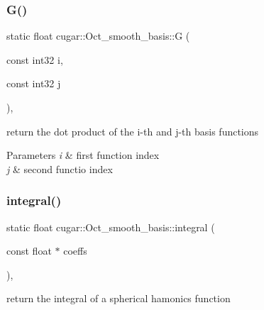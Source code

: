 \subsubsection{\texorpdfstring{G()}{G()}}
{\footnotesize\ttfamily static float cugar\+::\+Oct\+\_\+smooth\+\_\+basis\+::G (\begin{DoxyParamCaption}\item[{const int32}]{i,  }\item[{const int32}]{j }\end{DoxyParamCaption})\hspace{0.3cm}{\ttfamily [inline]}, {\ttfamily [static]}}

return the dot product of the i-\/th and j-\/th basis functions


\begin{DoxyParams}{Parameters}
{\em i} & first function index \\
\hline
{\em j} & second functio index \\
\hline
\end{DoxyParams}
\mbox{\label{structcugar_1_1_oct__smooth__basis_afdbf96838ebf4a79dfbbde82566ef711}} 
\subsubsection{\texorpdfstring{integral()}{integral()}\hspace{0.1cm}{\footnotesize\ttfamily [1/2]}}
{\footnotesize\ttfamily static float cugar\+::\+Oct\+\_\+smooth\+\_\+basis\+::integral (\begin{DoxyParamCaption}\item[{const float $\ast$}]{coeffs }\end{DoxyParamCaption})\hspace{0.3cm}{\ttfamily [inline]}, {\ttfamily [static]}}

return the integral of a spherical hamonics function \mbox{\label{structcugar_1_1_oct__smooth__basis_ac946455effe71333ecd1bfe51868196d}} 
